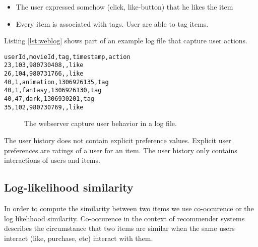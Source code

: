 \begin{itemize}
\item The user expressed somehow (click, like-button) that he likes the item
\item Every item is associated with tags. User are able to tag items.
\end{itemize}

Listing \ref{lst:weblog} shows part of an example log file that capture user actions.

\lstset{
basicstyle=\ttfamily,
columns=fullflexible,
keepspaces=true,
captionpos=b
}
\begin{lstlisting}[caption={User actions are stored in a web log.},label={lst:weblog}]
userId,movieId,tag,timestamp,action
23,103,980730408,,like
26,104,980731766,,like
40,1,animation,1306926135,tag
40,1,fantasy,1306926130,tag
40,47,dark,1306930201,tag
35,102,980730769,,like
\end{lstlisting}

\begin{figure}
\centering
{}
\caption{The webserver capture user behavior in a log file.}
\end{figure}

The user history does not contain explicit preference values. Explicit user preferences are ratings of a user for an item. The user history only contains interactions of users and items. 

\subsection{Log-likelihood similarity}
\label{sec:llr}

In order to compute the similarity between two items we use co-occurence or the log likelihood similarity.
Co-occurence in the context of recommender systems describes the circumstance that two items are similar when the same users interact (like, purchase, etc) interact with them.

